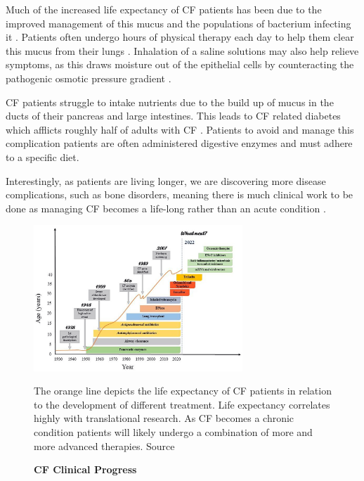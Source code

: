 Much of the increased life expectancy of CF patients has been due to the improved management of this mucus and the populations of bacterium infecting it \cite{}. Patients often undergo hours of physical therapy each day to help them clear this mucus from their lungs \cite{zotero-3683}. Inhalation of a saline solutions may also help relieve symptoms, as this draws moisture out of the epithelial cells by counteracting the pathogenic osmotic pressure gradient \cite{wark2018}. 

CF patients struggle to intake nutrients due to the build up of mucus in the ducts of their pancreas and large intestines. This leads to CF related diabetes which afflicts roughly half of adults with CF \cite{Kayani2018}. Patients to avoid and manage this complication patients are often administered digestive enzymes and must adhere to a specific diet. 

Interestingly, as patients are living longer, we are discovering more disease complications, such as bone disorders, meaning there is much clinical work to be done as managing CF becomes a life-long rather than an acute condition \cite{stalvey2013}. 

\begin{figure}
	\label{CF_life_expectancy}
	\begin{center}
	\includegraphics[width=0.7\textwidth]{figures/CF_life_expectancy.png}
	\end{center}
	\captionsetup{singlelinecheck = false, justification=raggedright}
	\caption[CF Clinical Progress] {\textbf{CF Clinical Progress}}{The orange line depicts the life expectancy of CF patients in relation to the development of different treatment.  Life expectancy correlates highly with translational research. As CF becomes a chronic condition patients will likely undergo a combination of more and more advanced therapies. Source \cite{garcia2022}} 
\end{figure}

